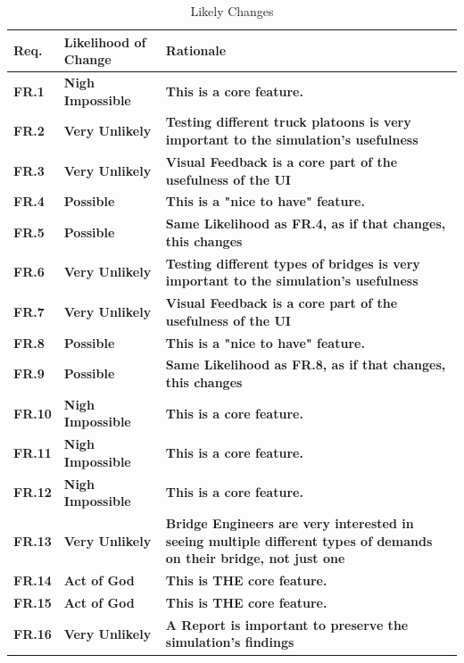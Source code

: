 \documentclass[12pt]{article}
\begin{document}
\begin{table}[H]
  \caption{Likely Changes} \label{TblLikelyChanges}
  \begin{tabular}{p{}|p{}|p{}}
  \toprule
  \textbf{Req.} & \textbf{Likelihood of Change} & \textbf{Rationale}\\
  \midrule
  \textbf{FR.1} & \textbf{Nigh Impossible} & \textbf{This is a core feature.}\\
  \midrule
  \textbf{FR.2} & \textbf{Very Unlikely} & \textbf{Testing different truck platoons is very important to the simulation's usefulness}\\
  \midrule
  \textbf{FR.3} & \textbf{Very Unlikely} & \textbf{Visual Feedback is a core part of the usefulness of the UI}\\
  \midrule
  \textbf{FR.4} & \textbf{Possible} & \textbf{This is a "nice to have" feature.}\\
  \midrule
  \textbf{FR.5} & \textbf{Possible} & \textbf{Same Likelihood as FR.4, as if that changes, this changes}\\
  \midrule
  \textbf{FR.6} & \textbf{Very Unlikely} & \textbf{Testing different types of bridges is very important to the simulation's usefulness}\\
  \midrule
  \textbf{FR.7} & \textbf{Very Unlikely} & \textbf{Visual Feedback is a core part of the usefulness of the UI}\\
  \midrule
  \textbf{FR.8} & \textbf{Possible} & \textbf{This is a "nice to have" feature.}\\
  \midrule
  \textbf{FR.9} & \textbf{Possible} & \textbf{Same Likelihood as FR.8, as if that changes, this changes}\\
  \midrule
  \textbf{FR.10} & \textbf{Nigh Impossible} & \textbf{This is a core feature.}\\
  \midrule
  \textbf{FR.11} & \textbf{Nigh Impossible} & \textbf{This is a core feature.}\\
  \midrule
  \textbf{FR.12} & \textbf{Nigh Impossible} & \textbf{This is a core feature.}\\
  \midrule
  \textbf{FR.13} & \textbf{Very Unlikely} & \textbf{Bridge Engineers are very interested in seeing multiple different types of demands on their bridge, not just one}\\
  \midrule
  \textbf{FR.14} & \textbf{Act of God} & \textbf{This is THE core feature.}\\
  \midrule
  \textbf{FR.15} & \textbf{Act of God} & \textbf{This is THE core feature.}\\
  \midrule
  \textbf{FR.16} & \textbf{Very Unlikely} & \textbf{A Report is important to preserve the simulation's findings}\\
  \bottomrule
\end{tabular}
\end{table}
\end{document}
